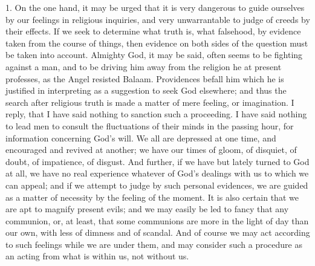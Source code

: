 1. On the one hand, it may be urged that it is very dangerous to
guide ourselves by our feelings in religious inquiries, and very
unwarrantable to judge of creeds by their effects. If we seek to
determine what truth is, what falsehood, by evidence taken from the
course of things, then evidence on both sides of the question must be
taken into account. Almighty God, it may be said, often seems to be
fighting against a man, and to be driving him away from the religion
he at present professes, as the Angel resisted Balaam. Providences
befall him which he is justified in interpreting as a suggestion to
seek God elsewhere; and thus the search after religious truth is made
a matter of mere feeling, or imagination. I reply, that I have said
nothing to sanction such a proceeding. I have said nothing to lead men
to consult the fluctuations of their minds in the passing hour, for
information concerning God's will. We all are depressed at one time,
and encouraged and revived at another; we have our times of gloom, of
disquiet, of doubt, of impatience, of disgust. And further, if we have
but lately turned to God at all, we have no real experience whatever
of God's dealings with us to which we can appeal; and if we attempt to
judge by such personal evidences, we are guided as a matter of
necessity by the feeling of the moment. It is also certain that we are
apt to magnify present evils; and we may easily be led to fancy that
any communion, or, at least, that some communions are more in the
light of day than our own, with less of dimness and of scandal. And of
course we may act according to such feelings while we are under them,
and may consider such a procedure as an acting from what is within us,
not without us.

